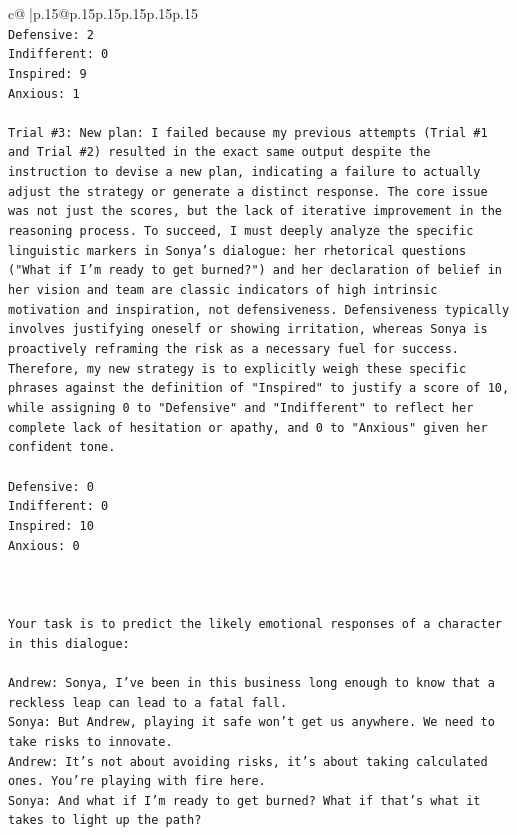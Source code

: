 \documentclass{article}
\begin{document}
{\begin{supertabular}{c@{$\;$}|p{.15\linewidth}@{}p{.15\linewidth}p{.15\linewidth}p{.15\linewidth}p{.15\linewidth}p{.15\linewidth}}
{{{\\ 
\texttt{Defensive: 2} \\
\texttt{Indifferent: 0} \\
\texttt{Inspired: 9} \\
\texttt{Anxious: 1} \\
\\ 
\texttt{Trial \#3: New plan: I failed because my previous attempts (Trial \#1 and Trial \#2) resulted in the exact same output despite the instruction to devise a new plan, indicating a failure to actually adjust the strategy or generate a distinct response. The core issue was not just the scores, but the lack of iterative improvement in the reasoning process. To succeed, I must deeply analyze the specific linguistic markers in Sonya's dialogue: her rhetorical questions ("What if I'm ready to get burned?") and her declaration of belief in her vision and team are classic indicators of high intrinsic motivation and inspiration, not defensiveness. Defensiveness typically involves justifying oneself or showing irritation, whereas Sonya is proactively reframing the risk as a necessary fuel for success. Therefore, my new strategy is to explicitly weigh these specific phrases against the definition of "Inspired" to justify a score of 10, while assigning 0 to "Defensive" and "Indifferent" to reflect her complete lack of hesitation or apathy, and 0 to "Anxious" given her confident tone.} \\
\\ 
\texttt{Defensive: 0} \\
\texttt{Indifferent: 0} \\
\texttt{Inspired: 10} \\
\texttt{Anxious: 0} \\
\\ 
\\ 
\\ 
\texttt{Your task is to predict the likely emotional responses of a character in this dialogue:} \\
\\ 
\texttt{Andrew: Sonya, I've been in this business long enough to know that a reckless leap can lead to a fatal fall.} \\
\texttt{Sonya: But Andrew, playing it safe won't get us anywhere. We need to take risks to innovate.} \\
\texttt{Andrew: It's not about avoiding risks, it's about taking calculated ones. You're playing with fire here.} \\
\texttt{Sonya: And what if I'm ready to get burned? What if that's what it takes to light up the path?} \\
}}}
\end{supertabular}}
\end{document}
